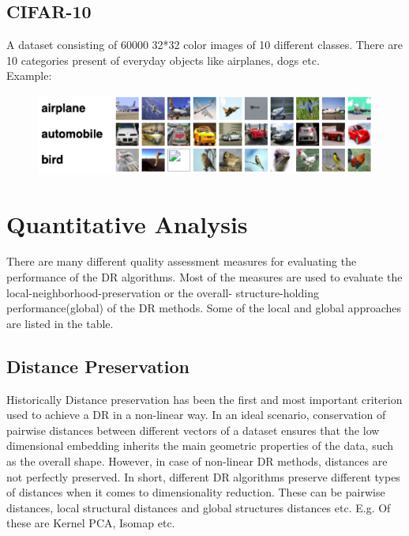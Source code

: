 \documentclass[letterpaper, 10 pt, conference]{ieeeconf}  %
\begin{document}
\subsection{CIFAR-10}
A dataset consisting of 60000 32*32 color images of 10 different classes. There are 10 categories present of everyday objects like airplanes, dogs etc.
\vspace{1mm}
\\Example:
\begin{figure}[h!]
	\centering
	\includegraphics[width=0.94\linewidth]{data4.png}
	\label{fig:data4.png}
\end{figure}

\section{Quantitative Analysis}
There are many different quality assessment measures for evaluating the performance of the DR algorithms. Most of the measures are used to evaluate the local-neighborhood-preservation or the overall- structure-holding performance(global) of the DR methods. Some of the local and global approaches are listed in the table.

\subsection{Distance Preservation}
Historically Distance preservation has been the first and most important criterion used to achieve a DR in a non-linear way. In an ideal scenario, conservation of pairwise distances between different vectors of a dataset ensures that the low dimensional embedding inherits the main geometric properties of the data, such as the overall shape. However, in case of non-linear DR methods, distances are not perfectly preserved. In short, different DR algorithms preserve different types of distances when it comes to dimensionality reduction. These can be pairwise distances, local structural distances and global structures distances etc. E.g. Of these are Kernel PCA, Isomap etc.
\end{document}
